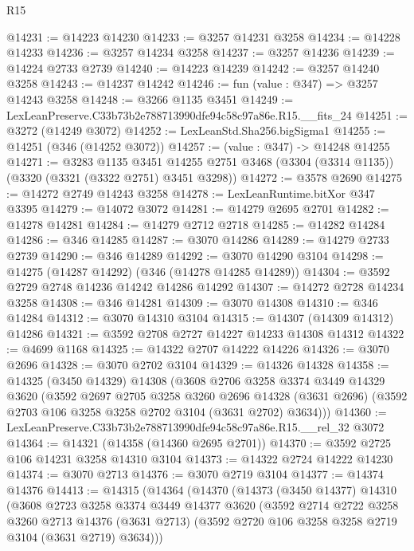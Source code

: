 \begin{lexlean}{R15}
\begin{coremodule}
@14231 := @14223 @14230
@14233 := @3257 @14231 @3258
@14234 := @14228 @14233
@14236 := @3257 @14234 @3258
@14237 := @3257 @14236
@14239 := @14224 @2733 @2739
@14240 := @14223 @14239
@14242 := @3257 @14240 @3258
@14243 := @14237 @14242
@14246 := fun (value : @347) => @3257 @14243 @3258
@14248 := @3266 @1135 @3451
@14249 := LexLeanPreserve.C33b73b2e788713990dfe94c58c97a86e.R15.__fits_24
@14251 := @3272 (@14249 @3072)
@14252 := LexLeanStd.Sha256.bigSigma1
@14255 := @14251 (@346 (@14252 @3072))
@14257 := (value : @347) -> @14248 @14255
@14271 := @3283
    @1135
    @3451
    @14255
    @2751
    @3468
    (@3304 (@3314 @1135))
    (@3320 (@3321 (@3322 @2751) @3451 @3298))
@14272 := @3578 @2690
@14275 := @14272 @2749 @14243 @3258
@14278 := LexLeanRuntime.bitXor @347 @3395
@14279 := @14072 @3072
@14281 := @14279 @2695 @2701
@14282 := @14278 @14281
@14284 := @14279 @2712 @2718
@14285 := @14282 @14284
@14286 := @346 @14285
@14287 := @3070 @14286
@14289 := @14279 @2733 @2739
@14290 := @346 @14289
@14292 := @3070 @14290 @3104
@14298 := @14275 (@14287 @14292) (@346 (@14278 @14285 @14289))
@14304 := @3592 @2729 @2748 @14236 @14242 @14286 @14292
@14307 := @14272 @2728 @14234 @3258
@14308 := @346 @14281
@14309 := @3070 @14308
@14310 := @346 @14284
@14312 := @3070 @14310 @3104
@14315 := @14307 (@14309 @14312) @14286
@14321 := @3592 @2708 @2727 @14227 @14233 @14308 @14312
@14322 := @4699 @1168
@14325 := @14322 @2707 @14222 @14226
@14326 := @3070 @2696
@14328 := @3070 @2702 @3104
@14329 := @14326 @14328
@14358 := @14325
    (@3450 @14329)
    @14308
    (@3608
      @2706
      @3258
      @3374
      @3449
      @14329
      @3620
      (@3592
        @2697
        @2705
        @3258
        @3260
        @2696
        @14328
        (@3631 @2696)
        (@3592 @2703 @106 @3258 @3258 @2702 @3104 (@3631 @2702) @3634)))
@14360 := LexLeanPreserve.C33b73b2e788713990dfe94c58c97a86e.R15.__rel_32 @3072
@14364 := @14321 (@14358 (@14360 @2695 @2701))
@14370 := @3592 @2725 @106 @14231 @3258 @14310 @3104
@14373 := @14322 @2724 @14222 @14230
@14374 := @3070 @2713
@14376 := @3070 @2719 @3104
@14377 := @14374 @14376
@14413 := @14315
    (@14364
      (@14370
        (@14373
          (@3450 @14377)
          @14310
          (@3608
            @2723
            @3258
            @3374
            @3449
            @14377
            @3620
            (@3592
              @2714
              @2722
              @3258
              @3260
              @2713
              @14376
              (@3631 @2713)
              (@3592 @2720 @106 @3258 @3258 @2719 @3104 (@3631 @2719) @3634)))

\end{coremodule}
\end{lexlean}
